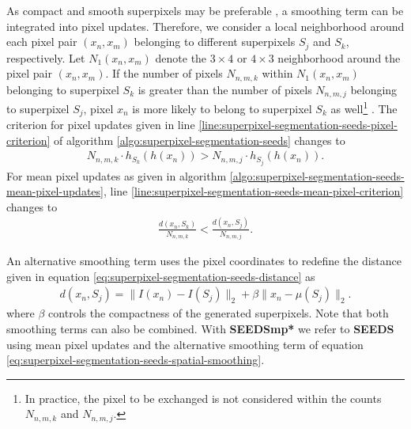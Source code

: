 As compact and smooth superpixels may be preferable \cite{SchickFischerStiefelhagen:2012}, a smoothing term can be integrated into pixel updates. Therefore, we consider a local neighborhood around each pixel pair $(x_n,x_m)$ belonging to different superpixels $S_j$ and $S_k$, respectively. Let $N_1(x_n,x_m)$ denote the $3 \times 4$ or $4 \times 3$ neighborhood around the pixel pair $(x_n, x_m)$. %
If the number of pixels $N_{n,m,k}$ within $N_1(x_n,x_m)$ belonging to superpixel $S_k$ is greater than the number of pixels $N_{n,m,j}$ belonging to superpixel $S_j$, pixel $x_n$ is more likely to belong to superpixel $S_k$ as well\footnote{In practice, the pixel to be exchanged is not considered within the counts $N_{n,m,k}$ and $N_{n,m,j}$.} \cite{VanDenBerghBoixRoigCapitaniVanGool:2012}. The criterion for pixel updates given in line \ref{line:superpixel-segmentation-seeds-pixel-criterion} of algorithm \ref{algo:superpixel-segmentation-seeds} changes to
\begin{align}
	\label{eq:superpixle-segmentation-seeds-original-smoothing}
	N_{n,m,k} \cdot h_{S_k}(h(x_n)) > N_{n,m,j} \cdot h_{S_j}(h(x_n)).
\end{align}
For mean pixel updates as given in algorithm \ref{algo:superpixel-segmentation-seeds-mean-pixel-updates}, line \ref{line:superpixel-segmentation-seeds-mean-pixel-criterion} changes to
\begin{align}
	\label{eq:superpixle-segmentation-seeds-original-smoothing-mean}
	\frac{d(x_n,S_k)}{N_{n,m,k}} < \frac{d(x_n, S_j)}{N_{n,m,j}}.
\end{align}

An alternative smoothing term \cite{VanDenBerghBoixRoigVanGool:2013} uses the pixel coordinates to redefine the distance given in equation \eqref{eq:superpixel-segmentation-seeds-distance} as
\begin{align}
	\label{eq:superpixel-segmentation-seeds-spatial-smoothing}
	d(x_n,S_j) = \| I(x_n) - I(S_j)\|_2 + \beta\|x_n - \mu(S_j)\|_2.
\end{align}
where $\beta$ controls the compactness of the generated superpixels. Note that both smoothing terms can also be combined. With \textbf{SEEDSmp*} we refer to \textbf{SEEDS} using mean pixel updates and the alternative smoothing term of equation \eqref{eq:superpixel-segmentation-seeds-spatial-smoothing}.

